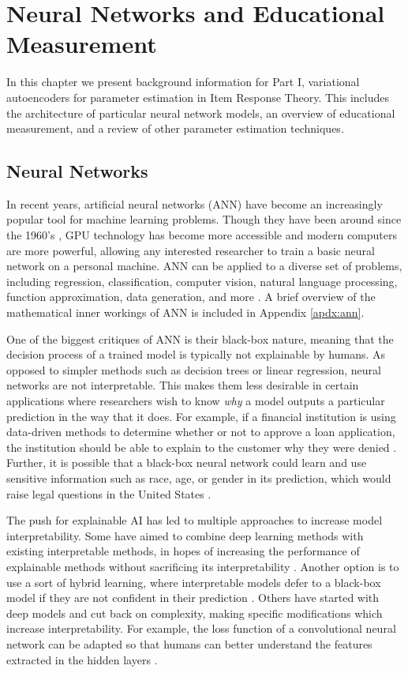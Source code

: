 \chapter{Neural Networks and Educational Measurement} \label{ch:irt_background}
In this chapter we present background information for Part I, variational autoencoders for parameter estimation in Item Response Theory. This includes the architecture of particular neural network models, an overview of educational measurement, and a review of other parameter estimation techniques.

\section*{Neural Networks}
In recent years, artificial neural networks (ANN) have become an increasingly popular tool for machine learning problems. Though they have been around since the 1960's \cite{rosenblatt1961}, GPU technology has become more accessible and modern computers are more powerful, allowing any interested researcher to train a basic neural network on a personal machine. ANN can be applied to a diverse set of problems, including regression, classification, computer vision, natural language processing, function approximation, data generation, and more \cite{hammerstrom1993} \cite{zhang2000}. A brief overview of the mathematical inner workings of ANN is included in Appendix \ref{apdx:ann}.

One of the biggest critiques of ANN is their black-box nature, meaning that the decision process of a trained model is typically not explainable by humans. As opposed to simpler methods such as decision trees or linear regression, neural networks are not interpretable. This makes them less desirable in certain applications where researchers wish to know \textit{why} a model outputs a particular prediction in the way that it does. For example, if a financial institution is using data-driven methods to determine whether or not to approve a loan application, the institution should be able to explain to the customer why they were denied \cite{chou2020}. Further, it is possible that a black-box neural network could learn and use sensitive information such as race, age, or gender in its prediction, which would raise legal questions in the United States \cite{ecoa}.

The push for explainable AI has led to multiple approaches to increase model interpretability. Some have aimed to combine deep learning methods with existing interpretable methods, in hopes of increasing the performance of explainable methods without sacrificing its interpretability \cite{goebel2018}. Another option is to use a sort of hybrid learning, where interpretable models defer to a black-box model if they are not confident in their prediction \cite{rafique2020}. Others have started with deep models and cut back on complexity, making specific modifications which increase interpretability. For example, the loss function of a convolutional neural network can be adapted so that humans can better understand the features extracted in the hidden layers \cite{zhang2018interpretable}. 

